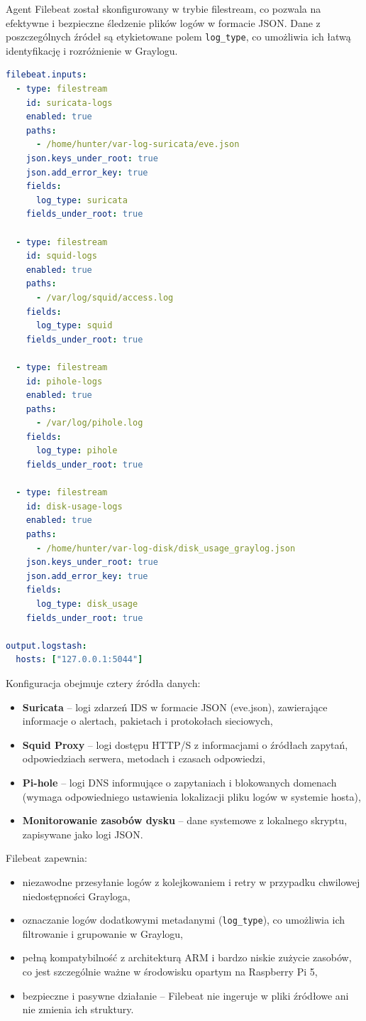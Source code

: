 \documentclass[
    left=2.5cm,         %
    right=2.5cm,        %
    top=2.5cm,          %
    bottom=3cm,         %
    bindingoffset=6mm,  %
    nohyphenation=true %
]{eiti/eiti-thesis} %
\begin{document}
Agent Filebeat został skonfigurowany w trybie filestream, co pozwala na efektywne i bezpieczne śledzenie plików logów w formacie JSON. Dane z poszczególnych źródeł są etykietowane polem \texttt{log\_type}, co umożliwia ich łatwą identyfikację i rozróżnienie w Graylogu.

\begin{lstlisting}[language=yaml, caption={Przykładowa konfiguracja Filebeat (filebeat.yml)}, label={lst:filebeat-config}]
filebeat.inputs:
  - type: filestream
    id: suricata-logs
    enabled: true
    paths:
      - /home/hunter/var-log-suricata/eve.json
    json.keys_under_root: true
    json.add_error_key: true
    fields:
      log_type: suricata
    fields_under_root: true

  - type: filestream
    id: squid-logs
    enabled: true
    paths:
      - /var/log/squid/access.log
    fields:
      log_type: squid
    fields_under_root: true

  - type: filestream
    id: pihole-logs
    enabled: true
    paths:
      - /var/log/pihole.log
    fields:
      log_type: pihole
    fields_under_root: true

  - type: filestream
    id: disk-usage-logs
    enabled: true
    paths:
      - /home/hunter/var-log-disk/disk_usage_graylog.json
    json.keys_under_root: true
    json.add_error_key: true
    fields:
      log_type: disk_usage
    fields_under_root: true

output.logstash:
  hosts: ["127.0.0.1:5044"]
\end{lstlisting}

Konfiguracja obejmuje cztery źródła danych:
\begin{itemize}
    \item \textbf{Suricata} – logi zdarzeń IDS w formacie JSON (eve.json), zawierające informacje o alertach, pakietach i protokołach sieciowych,
    \item \textbf{Squid Proxy} – logi dostępu HTTP/S z informacjami o źródłach zapytań, odpowiedziach serwera, metodach i czasach odpowiedzi,
    \item \textbf{Pi-hole} – logi DNS informujące o zapytaniach i blokowanych domenach (wymaga odpowiedniego ustawienia lokalizacji pliku logów w systemie hosta),
    \item \textbf{Monitorowanie zasobów dysku} – dane systemowe z lokalnego skryptu, zapisywane jako logi JSON.
\end{itemize}

Filebeat zapewnia:
\begin{itemize}
    \item niezawodne przesyłanie logów z kolejkowaniem i retry w przypadku chwilowej niedostępności Grayloga,
    \item oznaczanie logów dodatkowymi metadanymi (\texttt{log\_type}), co umożliwia ich filtrowanie i grupowanie w Graylogu,
    \item pełną kompatybilność z architekturą ARM i bardzo niskie zużycie zasobów, co jest szczególnie ważne w środowisku opartym na Raspberry Pi 5,
    \item bezpieczne i pasywne działanie – Filebeat nie ingeruje w pliki źródłowe ani nie zmienia ich struktury.
\end{itemize}
\end{document}
